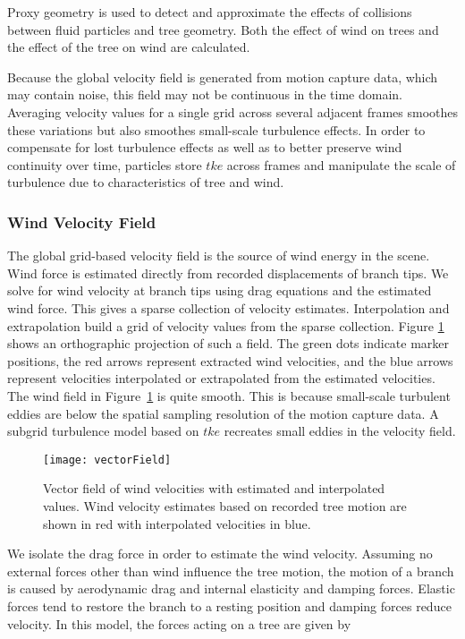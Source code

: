 Proxy geometry is used to detect and approximate the effects of collisions between fluid particles and tree geometry. Both the effect of wind on trees and the effect of the tree on wind are calculated.  

Because the global velocity field is generated from motion capture data, which may contain noise, this field may not be continuous in the time domain. Averaging velocity values for a single grid across several adjacent frames smoothes these variations but also smoothes small-scale turbulence effects. In order to compensate for lost turbulence effects as well as to better preserve wind continuity over time, particles store $tke$ across frames and manipulate the scale of turbulence due to characteristics of tree and wind. 

\subsubsection{Wind Velocity Field}

The global grid-based velocity field is the source of wind energy in the scene. Wind force is estimated directly from recorded displacements of branch tips. We solve for wind velocity at branch tips using drag equations and the estimated wind force.  This gives a sparse collection of velocity estimates.  Interpolation and extrapolation build a grid of velocity values from the sparse collection. Figure \ref{fig:vectorField} shows an orthographic projection of such a field. The green dots indicate marker positions, the red arrows represent extracted wind velocities, and the blue arrows represent velocities interpolated or extrapolated from the estimated velocities. The wind field in Figure~\ref{fig:vectorField} is quite smooth.  This is because small-scale turbulent eddies are below the spatial sampling resolution of the motion capture data.  A subgrid turbulence model based on $tke$ recreates small eddies in the velocity field. 

\begin{figure}[!t]
\centering
\texttt{[image: vectorField]}
\caption{Vector field of wind velocities with estimated and interpolated values. Wind velocity estimates based on recorded tree motion are shown in red with interpolated velocities in blue.}
\label{fig:vectorField}
\end{figure}

We isolate the drag force in order to estimate the wind velocity.  Assuming no external forces other than wind influence the tree motion, the motion of a branch is caused by aerodynamic drag and internal elasticity and damping forces. Elastic forces tend to restore the branch to a resting position and damping forces reduce velocity. In this model, the forces acting on a tree are given by 

